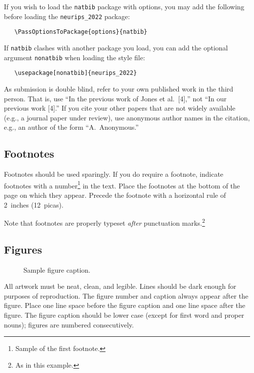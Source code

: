 \documentclass{article}
\begin{document}
If you wish to load the \verb+natbib+ package with options, you may add the
following before loading the \verb+neurips_2022+ package:
\begin{verbatim}
   \PassOptionsToPackage{options}{natbib}
\end{verbatim}


If \verb+natbib+ clashes with another package you load, you can add the optional
argument \verb+nonatbib+ when loading the style file:
\begin{verbatim}
   \usepackage[nonatbib]{neurips_2022}
\end{verbatim}


As submission is double blind, refer to your own published work in the third
person. That is, use ``In the previous work of Jones et al.\ [4],'' not ``In our
previous work [4].'' If you cite your other papers that are not widely available
(e.g., a journal paper under review), use anonymous author names in the
citation, e.g., an author of the form ``A.\ Anonymous.''


\subsection{Footnotes}


Footnotes should be used sparingly.  If you do require a footnote, indicate
footnotes with a number\footnote{Sample of the first footnote.} in the
text. Place the footnotes at the bottom of the page on which they appear.
Precede the footnote with a horizontal rule of 2~inches (12~picas).


Note that footnotes are properly typeset \emph{after} punctuation
marks.\footnote{As in this example.}


\subsection{Figures}


\begin{figure}
  \centering
  \fbox{\rule[-.5cm]{0cm}{4cm} \rule[-.5cm]{4cm}{0cm}}
  \caption{Sample figure caption.}
\end{figure}


All artwork must be neat, clean, and legible. Lines should be dark enough for
purposes of reproduction. The figure number and caption always appear after the
figure. Place one line space before the figure caption and one line space after
the figure. The figure caption should be lower case (except for first word and
proper nouns); figures are numbered consecutively.
\end{document}

